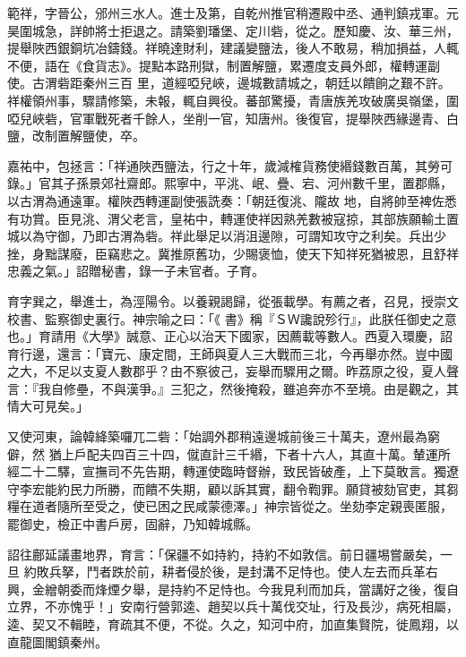 \begin{pinyinscope}
 範祥，字晉公，邠州三水人。進士及第，自乾州推官稍遷殿中丞、通判鎮戎軍。元昊圍城急，詳帥將士拒退之。請築劉璠堡、定川砦，從之。歷知慶、汝、華三州，提舉陜西銀銅坑冶鑄錢。祥曉達財利，建議變鹽法，後人不敢易，稍加損益，人輒不便，語在《食貨志》。提點本路刑獄，制置解鹽，累遷度支員外郎，權轉運副使。古渭砦距秦州三百
 里，道經啞兒峽，邊城數請城之，朝廷以饋餉之艱不許。祥權領州事，驟請修築，未報，輒自興役。蕃部驚擾，青唐族羌攻破廣吳嶺堡，圍啞兒峽砦，官軍戰死者千餘人，坐削一官，知唐州。後復官，提舉陜西緣邊青、白鹽，改制置解鹽使，卒。



 嘉祐中，包拯言：「祥通陜西鹽法，行之十年，歲減榷貨務使緡錢數百萬，其勞可錄。」官其子孫景郊社齋郎。熙寧中，平洮、岷、疊、宕、河州數千里，置郡縣，以古渭為通遠軍。權陜西轉運副使張詵奏：「朝廷復洮、隴故
 地，自將帥至裨佐悉有功賞。臣見洮、渭父老言，皇祐中，轉運使祥因熟羌數被寇掠，其部族願輸土置城以為守御，乃即古渭為砦。祥此舉足以消沮邊隙，可謂知攻守之利矣。兵出少挫，身黜謀廢，臣竊悲之。冀推原舊功，少賜褒恤，使天下知祥死猶被恩，且舒祥忠義之氣。」詔贈秘書，錄一子未官者。子育。



 育字巽之，舉進士，為涇陽令。以養親謁歸，從張載學。有薦之者，召見，授崇文校書、監察御史裏行。神宗喻之曰：「《
 書》稱『ＳＷ讒說殄行』，此朕任御史之意也。」育請用《大學》誠意、正心以治天下國家，因薦載等數人。西夏入環慶，詔育行邊，還言：「寶元、康定間，王師與夏人三大戰而三北，今再舉亦然。豈中國之大，不足以支夏人數郡乎？由不察彼己，妄舉而驟用之爾。昨荔原之役，夏人聲言：『我自修壘，不與漢爭。』三犯之，然後掩殺，雖追奔亦不至境。由是觀之，其情大可見矣。」



 又使河東，論韓絳築囉兀二砦：「始調外郡稍遠邊城前後三十萬夫，遼州最為窮僻，然
 猶上戶配夫四百三十四，僦直計三千緡，下者十六人，其直十萬。輦運所經二十二驛，宣撫司不先告期，轉運使臨時督辦，致民皆破產，上下莫敢言。獨遼守李宏能約民力所勝，而饋不失期，顧以訴其實，翻令鞫罪。願貸被劾官吏，其芻糧在道者隨所至受之，使已困之民咸蒙德澤。」神宗皆從之。坐劾李定親喪匿服，罷御史，檢正中書戶房，固辭，乃知韓城縣。



 詔往鄜延議畫地界，育言：「保疆不如持約，持約不如敦信。前日疆埸嘗嚴矣，一旦
 約敗兵拏，鬥者跌於前，耕者侵於後，是封溝不足恃也。使人左去而兵革右興，金繒朝委而烽煙夕舉，是持約不足恃也。今我見利而加兵，當講好之後，復自立界，不亦愧乎！」安南行營郭逵、趙契以兵十萬伐交址，行及長沙，病死相屬，逵、契又不輯睦，育疏其不便，不從。久之，知河中府，加直集賢院，徙鳳翔，以直龍圖閣鎮秦州。




\end{pinyinscope}
